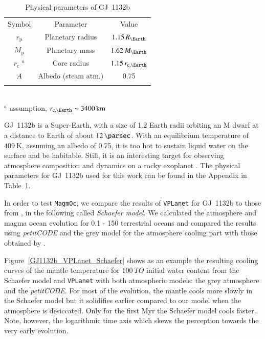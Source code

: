 \documentclass[paper=letterpaper,fontsize=12pt,oneside,twocolumn]{article}
\newcommand{\vplanet}{\texttt{\footnotesize{VPLanet}}}
\newcommand{\magmoc}{\texttt{\footnotesize{MagmOc}}}
\newcommand{\petit}{\textit{petitCODE}}
\begin{document}
\begin{table}[h]
	\caption[Parameters GJ~1132b]{Physical parameters of GJ~1132b \citep{Bonfils2018}}
	\begin{tabular}{ccc}
		\noalign{\smallskip}
		\hline
		\noalign{\smallskip}
		Symbol & Parameter & Value \\ 
		\noalign{\smallskip}
		\hline \hline
		\noalign{\smallskip}
		$r_\mathrm{p} $ & Planetary radius & $1.15 \, R_\Earth$ \\
		$M_\mathrm{p} $ & Planetary mass  & $1.62 \, M_\Earth$ \\
		$r_\mathrm{c}$ $^a$ & Core radius & $1.15 \, r_{\mathrm{c},\Earth}$ \\
		$A$ & Albedo (steam atm.)& 0.75 \\
		\noalign{\smallskip}
		\hline
	\end{tabular}
	\\
	$^a$ assumption, $r_{\mathrm{c},\Earth} \sim \SI{3400}{\kilo\metre}$
	\label{Tab_Param_GJ1132b}
\end{table}

GJ~1132b is a Super-Earth, with a size of 1.2 Earth radii orbiting an M dwarf at a distance to Earth of about $\SI{12}{\parsec}$.
With an equilibrium temperature of $\SI{409}{\kelvin}$, assuming an albedo of 0.75, it is too hot to sustain liquid water on the surface and be habitable.
Still, it is an interesting target for observing atmosphere composition and dynamics on a rocky exoplanet \citep{Berta-Thompson2015}.
The physical parameters for GJ~1132b used for this work can be found in the Appendix in Table~\ref{Tab_Param_GJ1132b}.

In order to test \magmoc{}, we compare the results of \vplanet{} for GJ~1132b to those from \citet{Schaefer2016}, in the following called \textit{Schaefer model}. We calculated the atmosphere and magma ocean evolution for 0.1 - 150 terrestrial oceans and compared the results using \petit{} \citep{Molliere2015, Molliere2017} and the grey model \citep{Elkins-Tanton2008, Carone2014} for the atmosphere cooling part with those obtained by \citet{Schaefer2016}.

Figure~\ref{GJ1132b_VPLanet_Schaefer} shows as an example the resulting cooling curves of the mantle temperature for $\SI{100}{TO}$ initial water content from the Schaefer model and \vplanet{} with both atmospheric models: the grey atmosphere and the \petit{}. For most of the evolution, the mantle cools more slowly in the Schaefer model but it solidifies earlier compared to our model when the atmosphere is desiccated. Only for the first Myr the Schaefer model cools faster. Note, however, the logarithmic time axis which skews the perception towards the very early evolution.
\end{document}

